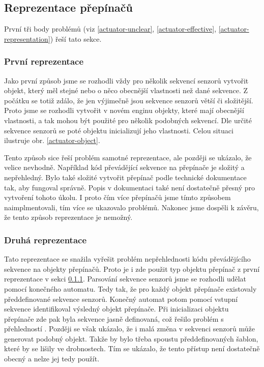 \subsection{Reprezentace přepínačů}
První tři body problémů  (viz \ref{actuator-unclear}, \ref{actuator-effective}, \ref{actuator-representation}) řeší tato sekce.

\subsubsection{První reprezentace}\label{rep-v1}

Jako první způsob jsme se rozhodli vždy pro několik sekvencí senzorů vytvořit objekt, který měl stejné nebo o něco obecnější vlastnosti než dané sekvence.
Z počátku se totiž zdálo, že jen výjimečně jsou sekvence senzorů větší či složitější. Proto jsme se rozhodli vytvořit v
novém enginu objekty, které mají obecnější vlastnosti, a tak mohou být použité pro několik podobných sekvencí. Dle určité sekvence senzorů se poté
objektu inicializují jeho vlastnosti. Celou situaci ilustruje obr. \ref{actuator-object}.


Tento způsob sice řeší problém samotné reprezentace, ale později se ukázalo, že velice nevhodně. Například
kód převádějící sekvence na přepínače je složitý a nepřehledný. Bylo také složité vytvořit přepínač podle technické dokumentace \cite{TechnicalDocumentationFontanel05}
tak, aby fungoval správně. Popis v dokumentaci \cite{TechnicalDocumentationFontanel05} také není dostatečně přesný pro vytvoření tohoto úkolu.
I proto čím více přepínačů jsme tímto způsobem naimplmentovali, tím více se ukazovalo problémů. Nakonec jsme dospěli k závěru, že tento způsob reprezentace je nemožný.

\subsubsection{Druhá reprezentace}

Tato reprezentace se snažila vyřešit problém nepřehlednosti kódu převádějícího sekvence na objekty přepínačů.
Proto je i zde použit typ objektu přepínač z první reprezentace v sekci \ref{rep-v1}. Parsování sekvence senzorů jsme se rozhodli udělat pomocí konečného 
automatu. Tedy tak, že pro každý objekt přepínače existovaly předdefinované sekvence senzorů. Konečný automat potom pomocí vstupní sekvence
identifikoval výsledný objekt přepínače. Při inicializaci objektu přepínače zde pak byla sekvence jasně definovaná, což řešilo problém s přehledností .
Později se však ukázalo, že i malá změna v sekvenci senzorů může generovat podobný objekt. Takže by bylo třeba
spoustu předdefinovaných šablon, které by se lišily ve drobnostech. Tím se ukázalo, že tento přístup není dostatečně obecný a nelze jej tedy použít. 

